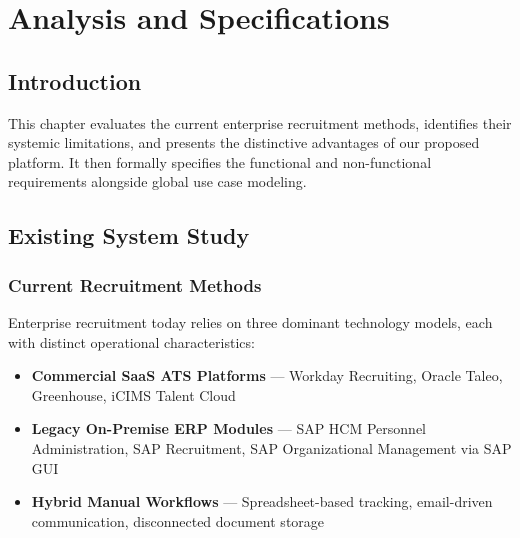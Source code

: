 \chapter{Analysis and Specifications}
\label{chap:analysis_specifications}

\section*{Introduction}

This chapter evaluates the current enterprise recruitment methods, identifies their systemic limitations, and presents the distinctive advantages of our proposed platform. It then formally specifies the functional and non-functional requirements alongside global use case modeling.

\newpage

\section{Existing System Study}
\label{sec:existing_system_study}

\subsection{Current Recruitment Methods}
\label{subsec:current_methods}

Enterprise recruitment today relies on three dominant technology models, each with distinct operational characteristics:

\begin{itemize}
    \item \textbf{Commercial SaaS ATS Platforms} --- Workday Recruiting, Oracle Taleo, Greenhouse, iCIMS Talent Cloud
    \item \textbf{Legacy On-Premise ERP Modules} --- SAP HCM Personnel Administration, SAP Recruitment, SAP Organizational Management via SAP GUI
    \item \textbf{Hybrid Manual Workflows} --- Spreadsheet-based tracking, email-driven communication, disconnected document storage
\end{itemize}

